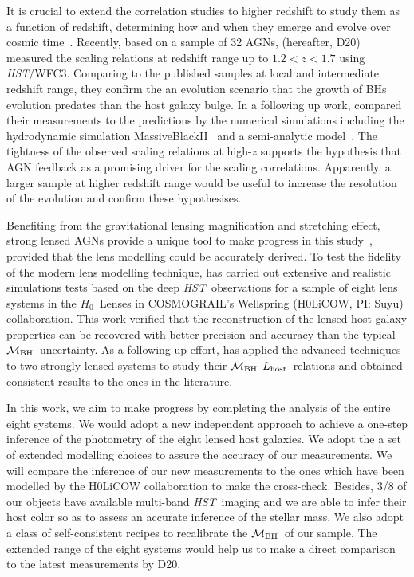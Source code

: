\documentclass[fleqn,usenatbib]{mnras}
\newcommand{\hst}{{\it HST}}
\newcommand{\hc}{$H_0$}
\newcommand{\mbh}{$\mathcal M_{\rm BH}$}
\newcommand{\lhost}{$L_{\rm host}$}
\begin{document}
It is crucial to extend the correlation studies to higher redshift to study them as a function of redshift, determining how and when they emerge and evolve over cosmic time~\citep[e.g.,][]{TMB04,Sal++06,Woo++06, Jah++09,SS13,Sun2015, Park15}. Recently, based on a sample of 32 AGNs, \citet{Ding2020a} (hereafter, D20) measured the scaling relations at redshift range up to $1.2<z<1.7$ using \hst/WFC3. Comparing to the published samples at local and intermediate redshift range, they confirm the an evolution scenario that the growth of BHs evolution predates than the host galaxy bulge. In a following up work, \citep{Ding2020b} compared their measurements to the predictions by the numerical simulations including the hydrodynamic simulation MassiveBlackII~\citep{Khandai2015} and a semi-analytic model~\citep{Menci2014}. The tightness of the observed scaling relations at high-$z$ supports the hypothesis that AGN feedback as a promising driver for the scaling correlations. Apparently, a larger sample at higher redshift range would be useful to increase the resolution of the evolution and confirm these hypothesises.

Benefiting from the gravitational lensing magnification and stretching effect, strong lensed AGNs provide a unique tool to make progress in this study~\citep{Peng2006}, provided that the lens modelling could be accurately derived. To test the fidelity of the modern lens modelling technique, \citet{Ding2017a} has carried out extensive and realistic simulations tests based on the deep \hst\ observations for a sample of eight lens systems in the \hc\ Lenses in COSMOGRAIL's Wellspring (H0LiCOW, PI: Suyu) collaboration. This work verified that the reconstruction of the lensed host galaxy properties can be recovered with better precision and accuracy than the typical \mbh\ uncertainty. As a following up effort, \citet{Ding2017b} has applied the advanced techniques to two strongly lensed systems to study their \mbh-\lhost\ relations and obtained consistent results to the ones in the literature.

In this work, we aim to make progress by completing the analysis of the entire eight systems. We would adopt a new independent approach to achieve a one-step inference of the photometry of the eight lensed host galaxies. We adopt the a set of extended modelling choices to assure the accuracy of our measurements. We will compare the inference of our new measurements to the ones which have been modelled by the H0LiCOW collaboration to make the cross-check. Besides, 3/8 of our objects have available multi-band \hst\ imaging and we are able to infer their host color so as to assess an accurate inference of the stellar mass. We also adopt a class of self-consistent recipes to recalibrate the \mbh\ of our sample. The extended range of the eight systems would help us to make a direct comparison to the latest measurements by D20. 
\end{document}
